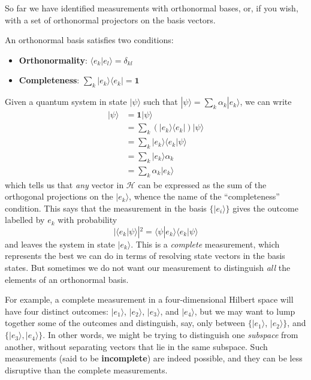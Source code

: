 \documentclass[fleqn,a4paper]{article}
\providecommand{\tightlist}{\setlength{\itemsep}{0pt}\setlength{\parskip}{0pt}}
\newenvironment{idea}{\everypar{\setlength{\parindent}{1.5em}}}{}
\theoremstyle{definition}
\theoremstyle{definition}
\theoremstyle{definition}
\theoremstyle{definition}
\theoremstyle{remark}
\begin{document}
So far we have identified measurements with orthonormal bases, or, if you wish, with a set of orthonormal projectors on the basis vectors.

\begin{idea}

An orthonormal basis satisfies two conditions:

\begin{itemize}
\tightlist
\item
  \textbf{Orthonormality}: \(\langle e_k|e_l\rangle = \delta_{kl}\)
\item
  \textbf{Completeness}: \(\sum_k|e_k\rangle\langle e_k| = \mathbf{1}\)
\end{itemize}

\end{idea}

Given a quantum system in state \(|\psi\rangle\) such that \(|\psi\rangle = \sum_k \alpha_k|e_k\rangle\), we can write
\[
  \begin{aligned}
    |\psi\rangle
    &= \mathbf{1}|\psi\rangle
  \\&= \sum_k (|e_k\rangle\langle e_k|) |\psi\rangle
  \\&= \sum_k |e_k\rangle\langle e_k|\psi\rangle
  \\&= \sum_k |e_k\rangle\alpha_k
  \\&= \sum_k \alpha_k|e_k\rangle
  \end{aligned}
\]
which tells us that \emph{any} vector in \(\mathcal{H}\) can be expressed as the sum of the orthogonal projections on the \(|e_k\rangle\), whence the name of the ``completeness'' condition.
This says that the measurement in the basis \(\{|e_i\rangle\}\) gives the outcome labelled by \(e_k\) with probability
\[
  |\langle e_k|\psi\rangle|^2 = \langle\psi|e_k\rangle\langle e_k|\psi\rangle
\]
and leaves the system in state \(|e_k\rangle\).
This is a \emph{complete} measurement, which represents the best we can do in terms of resolving state vectors in the basis states.
But sometimes we do not want our measurement to distinguish \emph{all} the elements of an orthonormal basis.

For example, a complete measurement in a four-dimensional Hilbert space will have four distinct outcomes: \(|e_1\rangle\), \(|e_2\rangle\), \(|e_3\rangle\), and \(|e_4\rangle\), but we may want to lump together some of the outcomes and distinguish, say, only between \(\{|e_1\rangle\), \(|e_2\rangle\}\), and \(\{|e_3\rangle,|e_4\rangle\}\).
In other words, we might be trying to distinguish one \emph{subspace} from another, without separating vectors that lie in the same subspace.
Such measurements (said to be \textbf{incomplete}) are indeed possible, and they can be less disruptive than the complete measurements.
\end{document}
